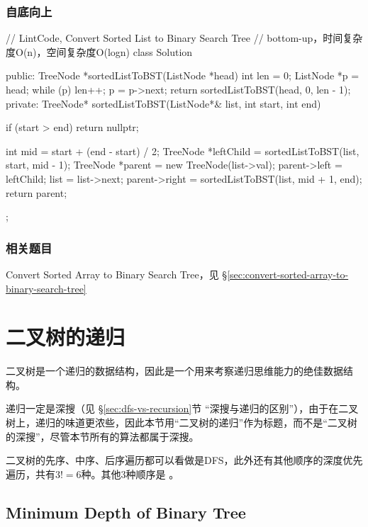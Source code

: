 \subsubsection{自底向上}
\begin{Code}
// LintCode, Convert Sorted List to Binary Search Tree
// bottom-up，时间复杂度O(n)，空间复杂度O(logn)
class Solution {
public:
    TreeNode *sortedListToBST(ListNode *head) {
        int len = 0;
        ListNode *p = head;
        while (p) {
            len++;
            p = p->next;
        }
        return sortedListToBST(head, 0, len - 1);
    }
private:
    TreeNode* sortedListToBST(ListNode*& list, int start, int end) {
        if (start > end) return nullptr;

        int mid = start + (end - start) / 2;
        TreeNode *leftChild = sortedListToBST(list, start, mid - 1);
        TreeNode *parent = new TreeNode(list->val);
        parent->left = leftChild;
        list = list->next;
        parent->right = sortedListToBST(list, mid + 1, end);
        return parent;
    }
};
\end{Code}


\subsubsection{相关题目}
\begindot
\item Convert Sorted Array to Binary Search Tree，见 \S \ref{sec:convert-sorted-array-to-binary-search-tree}
\myenddot


\section{二叉树的递归} %
二叉树是一个递归的数据结构，因此是一个用来考察递归思维能力的绝佳数据结构。

递归一定是深搜（见 \S \ref{sec:dfs-vs-recursion}节 “深搜与递归的区别”），由于在二叉树上，递归的味道更浓些，因此本节用“二叉树的递归”作为标题，而不是“二叉树的深搜”，尽管本节所有的算法都属于深搜。

二叉树的先序、中序、后序遍历都可以看做是DFS，此外还有其他顺序的深度优先遍历，共有$3!=6$种。其他3种顺序是 。


\subsection{Minimum Depth of Binary Tree}
\label{sec:minimum-depth-of-binary-tree}


